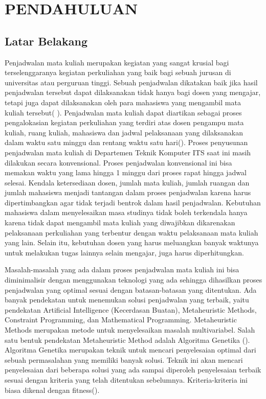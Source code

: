 \chapter{PENDAHULUAN}

\section{Latar Belakang}

Penjadwalan mata kuliah merupakan kegiatan yang sangat krusial bagi terselenggaranya kegiatan perkuliahan yang baik bagi sebuah jurusan di universitas atau perguruan tinggi. 
Sebuah penjadwalan dikatakan baik jika hasil penjadwalan tersebut dapat dilaksanakan tidak hanya bagi dosen yang mengajar, tetapi juga dapat dilaksanakan oleh para mahasiswa yang mengambil mata kuliah tersebut(  \cite{ramadhani2021perancangan}).
Penjadwalan mata kuliah dapat diartikan sebagai proses pengalokasian kegiatan perkuliahan yang terdiri atas dosen pengampu mata kuliah, ruang kuliah, mahasiswa dan jadwal pelaksanaan yang dilaksanakan dalam waktu satu minggu dan rentang waktu satu hari(\cite{Mone2021}).
Proses penyusunan penjadwalan mata kuliah di Departemen Teknik Komputer ITS saat ini masih dilakukan secara konvensional. Proses penjadwalan konvensional ini bisa memakan waktu yang lama hingga 1 minggu dari proses rapat hingga jadwal selesai. 
Kendala ketersediaan dosen, jumlah mata kuliah, jumlah ruangan dan jumlah mahasiswa menjadi tantangan dalam proses penjadwalan karena harus dipertimbangkan agar tidak terjadi bentrok dalam hasil penjadwalan. 
Kebutuhan mahasiswa dalam menyelesaikan masa studinya tidak boleh terkendala hanya karena tidak dapat mengambil mata kuliah yang diwajibkan dikarenakan pelaksanaan perkuliahan yang terbentur dengan waktu pelaksanaan mata kuliah yang lain. 
Selain itu, kebutuhan dosen yang harus meluangkan banyak waktunya untuk melakukan tugas lainnya selain mengajar, juga harus diperhitungkan.

Masalah-masalah yang ada dalam proses penjadwalan mata kuliah ini bisa diminimalisir dengan menggunakan teknologi yang ada sehingga dihasilkan proses penjadwalan yang optimal sesuai dengan batasan-batasan yang ditentukan. 
Ada banyak pendekatan untuk menemukan solusi penjadwalan yang terbaik, yaitu pendekatan Artificial Intelligence (Kecerdasan Buatan), Metaheuristic Methods, Constraint Programming, dan Mathematical Programming. 
Metaheuristic Methods merupakan metode untuk menyelesaikan masalah multivariabel. Salah satu bentuk pendekatan Metaheuristic Method adalah Algoritma Genetika (\cite{ramadhani2021perancangan}). 	
Algoritma Genetika merupakan teknik untuk mencari penyelesaian optimal dari sebuah permasalahan yang memiliki banyak solusi. Teknik ini akan mencari penyelesaian dari beberapa solusi yang ada sampai diperoleh penyelesaian terbaik sesuai dengan kriteria yang telah ditentukan sebelumnya. 
Kriteria-kriteria ini biasa dikenal dengan fitness(\cite{binusAlgoritmaGenetika}).

